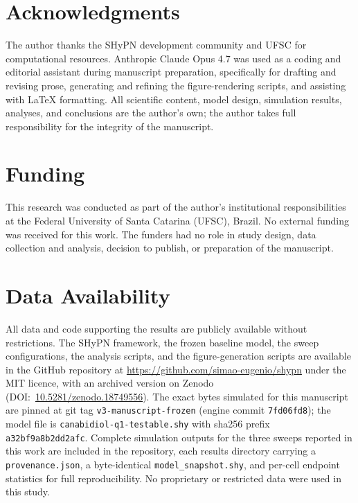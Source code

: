 \documentclass[10pt,letterpaper]{article}
\begin{document}
\section*{Acknowledgments}

The author thanks the SHyPN development community and UFSC for computational resources. Anthropic Claude Opus 4.7 was used as a coding and editorial assistant during manuscript preparation, specifically for drafting and revising prose, generating and refining the figure-rendering scripts, and assisting with LaTeX formatting. All scientific content, model design, simulation results, analyses, and conclusions are the author's own; the author takes full responsibility for the integrity of the manuscript.

\section*{Funding}

This research was conducted as part of the author's institutional responsibilities at the Federal University of Santa Catarina (UFSC), Brazil. No external funding was received for this work. The funders had no role in study design, data collection and analysis, decision to publish, or preparation of the manuscript.

\section*{Data Availability}

\begingroup\sloppy
All data and code supporting the results are publicly available without restrictions. The SHyPN framework, the frozen baseline model, the sweep configurations, the analysis scripts, and the figure-generation scripts are available in the GitHub repository at \url{https://github.com/simao-eugenio/shypn} under the MIT licence, with an archived version on Zenodo (DOI:~\href{https://doi.org/10.5281/zenodo.18749556}{10.5281/zenodo.18749556}). The exact bytes simulated for this manuscript are pinned at git tag \texttt{v3-manuscript-frozen} (engine commit \texttt{7fd06fd8}); the model file is \texttt{canabidiol-q1-testable.shy} with sha256 prefix \texttt{a32bf9a8b2dd2afc}. Complete simulation outputs for the three sweeps reported in this work are included in the repository, each results directory carrying a \texttt{provenance.json}, a byte-identical \texttt{model\_snapshot.shy}, and per-cell endpoint statistics for full reproducibility. No proprietary or restricted data were used in this study.
\par\endgroup
\end{document}

